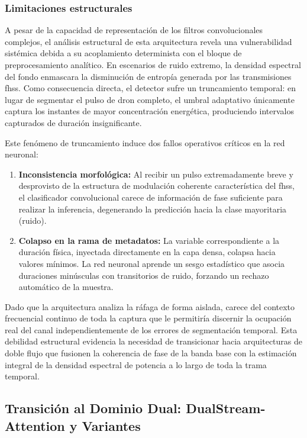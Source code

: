 \subsubsection{Limitaciones estructurales}
A pesar de la capacidad de representación de los filtros convolucionales complejos, el análisis estructural de esta arquitectura revela una vulnerabilidad sistémica debida a su acoplamiento determinista con el bloque de preprocesamiento analítico. En escenarios de ruido extremo, la densidad espectral del fondo enmascara la disminución de entropía generada por las transmisiones \gls{fhss}. Como consecuencia directa, el detector sufre un truncamiento temporal: en lugar de segmentar el pulso de dron completo, el umbral adaptativo únicamente captura los instantes de mayor concentración energética, produciendo intervalos capturados de duración insignificante.

Este fenómeno de truncamiento induce dos fallos operativos críticos en la red neuronal:
\begin{enumerate}
    \item \textbf{Inconsistencia morfológica:} Al recibir un pulso extremadamente breve y desprovisto de la estructura de modulación coherente característica del \gls{fhss}, el clasificador convolucional carece de información de fase suficiente para realizar la inferencia, degenerando la predicción hacia la clase mayoritaria (ruido).
    \item \textbf{Colapso en la rama de metadatos:} La variable correspondiente a la duración física, inyectada directamente en la capa densa, colapsa hacia valores mínimos. La red neuronal aprende un sesgo estadístico que asocia duraciones minúsculas con transitorios de ruido, forzando un rechazo automático de la muestra.
\end{enumerate}

Dado que la arquitectura analiza la ráfaga de forma aislada, carece del contexto frecuencial continuo de toda la captura que le permitiría discernir la ocupación real del canal independientemente de los errores de segmentación temporal. Esta debilidad estructural evidencia la necesidad de transicionar hacia arquitecturas de doble flujo que fusionen la coherencia de fase de la banda base con la estimación integral de la densidad espectral de potencia a lo largo de toda la trama temporal.

\subsection{Transición al Dominio Dual: DualStream-Attention y Variantes}
\label{subsec:dualstream_attn}

